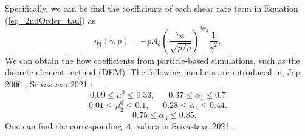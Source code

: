 Specifically, we can be find the coefficients of each shear rate term in Equation (\ref{eq_2ndOrder_tau}) as
\begin{equation}
     \eta_3 (\dot{\gamma}, p) = 
    -p A_3 
        \left( \frac{\dot{\gamma} a }{\sqrt{p/\rho}}  \right)^{2\alpha_3} 
        \frac{1}{\dot{\gamma}^2},
\label{eq_gr_eta_3}
\end{equation}
We can obtain the flow coefficients from particle-based simulations, such as the discrete element method (DEM). The following numbers are introduced in, Jop 2006 \cite{jop_constitutive_2006}; Srivastava 2021 \cite{srivastava_viscometric_2021}:
    \[
    0.09 \leq \mu_1^0 \leq 0.33, 
    \ \ \ \ \ \ \ 
    0.37 \leq \alpha_1 \leq 0.7
    \]
        \[
    0.01 \leq \mu_2^0 \leq 0.1, 
    \ \ \ \ \ \ \ 
    0.28 \leq \alpha_2 \leq 0.44.
    \]
            \[
    \ \ \ \ \ \ \ 
    0.75 \leq \alpha_3 \leq 0.85.
    \]
     One can find the corresponding $A_i$ values in Srivastava 2021 \cite{srivastava_viscometric_2021}.

